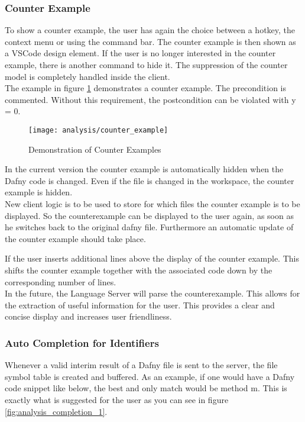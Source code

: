 \subsubsection{Counter Example}
To show a counter example, the user has again the choice between a hotkey, the context menu or using the command bar. The counter example is then shown as a VSCode design element. If the user is no longer interested in the counter example, there is another command to hide it. The suppression of the counter model is completely handled inside the client. \\

The example in figure \ref{fig:analysis_counter_example} demonstrates a counter example.
The precondition is commented. Without this requirement, the postcondition can be violated with y = 0.

\begin{figure}[H]
    \centering
    \texttt{[image: analysis/counter\_example]}
    \caption{Demonstration of Counter Examples}
    \label{fig:analysis_counter_example}
\end{figure}

In the current version the counter example is automatically hidden when the Dafny code is changed.
Even if the file is changed in the workspace, the counter example is hidden. \\

New client logic is to be used to store for which files the counter example is to be displayed.
So the counterexample can be displayed to the user again, as soon as he switches back to the original dafny file.
Furthermore an automatic update of the counter example should take place.

If the user inserts additional lines above the display of the counter example.
This shifts the counter example together with the associated code down by the corresponding number of lines. \\

In the future, the Language Server will parse the counterexample.
This allows for the extraction of useful information for the user.
This provides a clear and concise display and increases user friendliness.

\subsubsection{Auto Completion for Identifiers}
Whenever a valid interim result of a Dafny file is sent to the server, the file symbol table is created and buffered.
As an example, if one would have a Dafny code snippet like below, the best and only match would be method m. This is exactly what is suggested for the user as you can see in figure \ref{fig:analysis_completion_1}.

